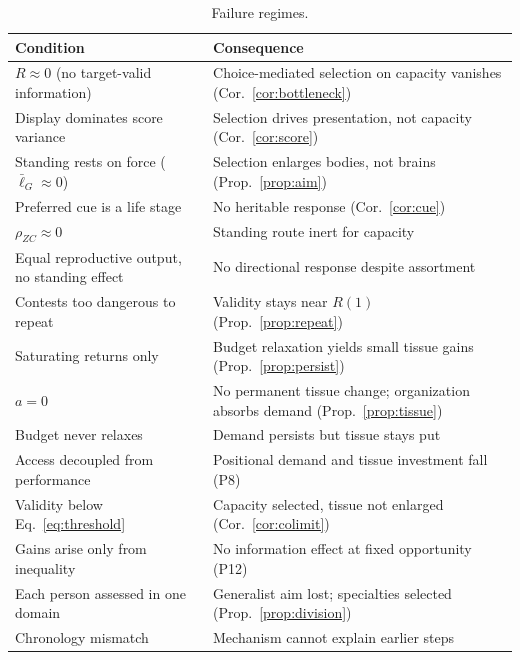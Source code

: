 \begin{table}[t]
\caption{Failure regimes.}\label{tab:failure}
\footnotesize
\begin{tabularx}{\columnwidth}{@{}P{0.40\columnwidth}L@{}}
\toprule
Condition & Consequence\\
\midrule
$R\approx0$ (no target-valid information) & Choice-mediated selection on capacity vanishes (Cor.~\ref{cor:bottleneck})\\
Display dominates score variance & Selection drives presentation, not capacity (Cor.~\ref{cor:score})\\
Standing rests on force ($\bar\ell_G\approx0$) & Selection enlarges bodies, not brains (Prop.~\ref{prop:aim})\\
Preferred cue is a life stage & No heritable response (Cor.~\ref{cor:cue})\\
$\rho_{ZC}\approx0$ & Standing route inert for capacity\\
Equal reproductive output, no standing effect & No directional response despite assortment\\
Contests too dangerous to repeat & Validity stays near $R(1)$ (Prop.~\ref{prop:repeat})\\
Saturating returns only & Budget relaxation yields small tissue gains (Prop.~\ref{prop:persist})\\
$a=0$ & No permanent tissue change; organization absorbs demand (Prop.~\ref{prop:tissue})\\
Budget never relaxes & Demand persists but tissue stays put\\
Access decoupled from performance & Positional demand and tissue investment fall (P8)\\
Validity below Eq.~\eqref{eq:threshold} & Capacity selected, tissue not enlarged (Cor.~\ref{cor:colimit})\\
Gains arise only from inequality & No information effect at fixed opportunity (P12)\\
Each person assessed in one domain & Generalist aim lost; specialties selected (Prop.~\ref{prop:division})\\
Chronology mismatch & Mechanism cannot explain earlier steps\\
\bottomrule
\end{tabularx}
\end{table}
